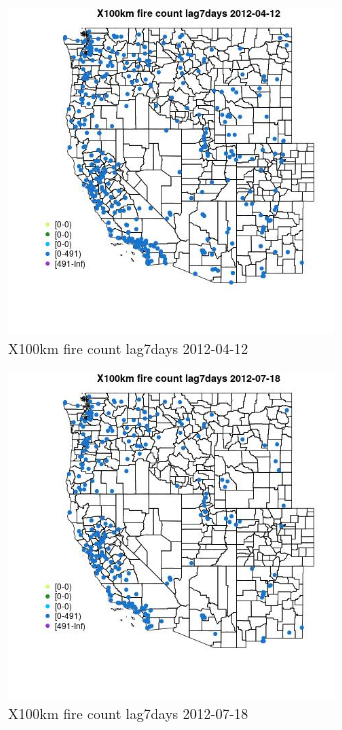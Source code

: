 \begin{figure} 
\centering  
\includegraphics[width=0.77\textwidth]{Code_Outputs/Report_ML_input_PM25_Step4_part_e_de_duplicated_aves_compiled_2019-05-14wNAs_MapObsX100km_fire_count_lag7days2012-04-12.jpg} 
\caption{\label{fig:Report_ML_input_PM25_Step4_part_e_de_duplicated_aves_compiled_2019-05-14wNAsMapObsX100km_fire_count_lag7days2012-04-12}X100km fire count lag7days 2012-04-12} 
\end{figure} 
 

\begin{figure} 
\centering  
\includegraphics[width=0.77\textwidth]{Code_Outputs/Report_ML_input_PM25_Step4_part_e_de_duplicated_aves_compiled_2019-05-14wNAs_MapObsX100km_fire_count_lag7days2012-07-18.jpg} 
\caption{\label{fig:Report_ML_input_PM25_Step4_part_e_de_duplicated_aves_compiled_2019-05-14wNAsMapObsX100km_fire_count_lag7days2012-07-18}X100km fire count lag7days 2012-07-18} 
\end{figure} 
 

